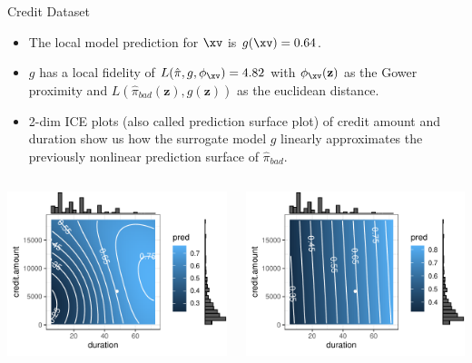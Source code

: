 \documentclass[11pt,compress,t,notes=noshow, xcolor=table]{beamer}
\newcommand{\neigh}{\phi_{\xv}}
\newcommand{\zv}{\mathbf{z}}
\newcommand{\pih}{\hat{\pi}}
\begin{document}
\begin{vbframe}{Credit Dataset}
\begin{itemize}
	\item The local model prediction for $\xv$ is $g(\xv) = 0.64$. 
	\item $g$ has a local fidelity of $L(\pih, g, \neigh) = 4.82$ with $\neigh(\zv)$ as the Gower proximity and $L(\pih_{bad}(\zv), g(\zv))$ as the euclidean distance. 
	\item 2-dim ICE plots (also called prediction surface plot) of credit amount and duration show us how the surrogate model $g$ linearly approximates the previously nonlinear prediction surface of $\pih_{bad}$. 
\end{itemize}
\vspace{-0.4cm}
 \begin{columns}
	\begin{column}{0.47\textwidth}
		\begin{center}
		\includegraphics[width=1\textwidth]{figure/lime_credit_ice1.pdf}
		\end{center}		
	\end{column}
	\begin{column}{0.46\textwidth}  
		\begin{center}
				\includegraphics[width=1\textwidth]{figure/lime_credit_ice2.pdf}
		\end{center}
			

\end{column}
\end{columns}
\end{vbframe}
\end{document}
